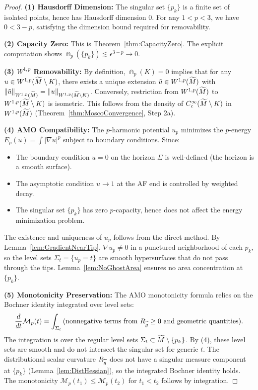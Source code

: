 \begin{proof}
\textbf{(1) Hausdorff Dimension:} The singular set $\{p_k\}$ is a finite set of isolated points, hence has Hausdorff dimension 0. For any $1 < p < 3$, we have $0 < 3 - p$, satisfying the dimension bound required for removability.

\textbf{(2) Capacity Zero:} This is Theorem~\ref{thm:CapacityZero}. The explicit computation shows $\Cap_p(\{p_k\}) \lesssim \epsilon^{3-p} \to 0$.

\textbf{(3) $W^{1,p}$ Removability:} By definition, $\Cap_p(K) = 0$ implies that for any $u \in W^{1,p}(\widetilde{M} \setminus K)$, there exists a unique extension $\tilde{u} \in W^{1,p}(\widetilde{M})$ with $\|\tilde{u}\|_{W^{1,p}(\widetilde{M})} = \|u\|_{W^{1,p}(\widetilde{M} \setminus K)}$. Conversely, restriction from $W^{1,p}(\widetilde{M})$ to $W^{1,p}(\widetilde{M} \setminus K)$ is isometric. This follows from the density of $C^\infty_c(\widetilde{M} \setminus K)$ in $W^{1,p}(\widetilde{M})$ (Theorem~\ref{thm:MoscoConvergence}, Step 2a).

\textbf{(4) AMO Compatibility:} The $p$-harmonic potential $u_p$ minimizes the $p$-energy $E_p(u) = \int |\nabla u|^p$ subject to boundary conditions. Since:
\begin{itemize}
    \item The boundary condition $u = 0$ on the horizon $\Sigma$ is well-defined (the horizon is a smooth surface).
    \item The asymptotic condition $u \to 1$ at the AF end is controlled by weighted decay.
    \item The singular set $\{p_k\}$ has zero $p$-capacity, hence does not affect the energy minimization problem.
\end{itemize}
The existence and uniqueness of $u_p$ follows from the direct method. By Lemma~\ref{lem:GradientNearTip}, $\nabla u_p \neq 0$ in a punctured neighborhood of each $p_k$, so the level sets $\Sigma_t = \{u_p = t\}$ are smooth hypersurfaces that do not pass through the tips. Lemma~\ref{lem:NoGhostArea} ensures no area concentration at $\{p_k\}$.

\textbf{(5) Monotonicity Preservation:} The AMO monotonicity formula relies on the Bochner identity integrated over level sets:
\[
\frac{d}{dt} \mathcal{M}_p(t) = \int_{\Sigma_t} \text{(nonnegative terms from } R_{\widetilde{g}} \ge 0 \text{ and geometric quantities)}.
\]
The integration is over the regular level sets $\Sigma_t \subset \widetilde{M} \setminus \{p_k\}$. By (4), these level sets are smooth and do not intersect the singular set for generic $t$. The distributional scalar curvature $R_{\widetilde{g}}$ does not have a singular measure component at $\{p_k\}$ (Lemma~\ref{lem:DistHessian}), so the integrated Bochner identity holds. The monotonicity $\mathcal{M}_p(t_1) \le \mathcal{M}_p(t_2)$ for $t_1 < t_2$ follows by integration.
\end{proof}

